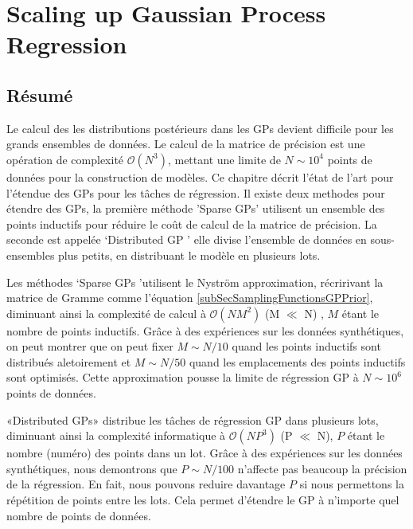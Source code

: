 \chapter{Scaling up Gaussian Process Regression}
\label{chapScalingGPR}


\begin{mdframed}[hidealllines=true,backgroundcolor=lightgray!20]
\section*{Résumé}
Le calcul des les distributions postérieurs dans les GPs devient difficile pour les grands ensembles de données. Le calcul de la matrice de précision est une opération de complexité $ \mathcal{O}(N ^ {3}) $, mettant une limite de $ N \sim 10^4 $ points de données pour la construction de modèles. Ce chapitre décrit l'état de l'art pour l'étendue des GPs pour les tâches de régression. Il existe deux methodes pour étendre des GPs, la première méthode 'Sparse GPs' utilisent un ensemble des points inductifs pour réduire le coût de calcul de la matrice de précision. La seconde est appelée `Distributed GP ' elle divise l'ensemble de données en sous-ensembles plus petits, en distribuant le modèle en plusieurs lots.

Les méthodes `Sparse GPs 'utilisent le Nystr\"{o}m approximation, récririvant la matrice de Gramme comme l'équation \ref{subSecSamplingFunctionsGPPrior}, diminuant ainsi la complexité de calcul à $ \mathcal{O} (NM^{2}) $ (M $ \ll $ N) , $ M $ étant le nombre de points inductifs. Grâce à des expériences sur les données synthétiques, on peut montrer que on peut fixer $ M \sim N/10 $ quand les points inductifs sont distribués aletoirement et $ M \sim N/50 $ quand les emplacements des points inductifs sont optimisés. Cette approximation pousse la limite de régression GP à $ N \sim 10^6 $ points de données.

«Distributed GPs» distribue les tâches de régression GP dans plusieurs lots, diminuant ainsi la complexité informatique à $ \mathcal{O} (NP^{3}) $ (P $\ll$ N), $ P $ étant le nombre (numéro) des points dans un lot. Grâce à des expériences sur les données synthétiques, nous demontrons que $ P \sim N/100 $ n'affecte pas beaucoup la précision de la régression. En fait, nous pouvons reduire davantage $ P $ si nous permettons la répétition de points entre les lots. Cela permet d'étendre le GP à n'importe quel nombre de points de données.
\end{mdframed}


